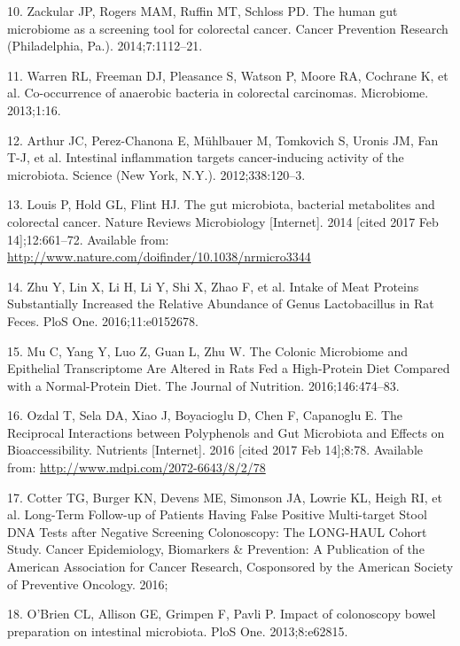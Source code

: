 \documentclass[12pt,]{article}
\begin{document}
\hypertarget{ref-zackular_human_2014}{}
10. Zackular JP, Rogers MAM, Ruffin MT, Schloss PD. The human gut
microbiome as a screening tool for colorectal cancer. Cancer Prevention
Research (Philadelphia, Pa.). 2014;7:1112--21.

\hypertarget{ref-warren_co-occurrence_2013}{}
11. Warren RL, Freeman DJ, Pleasance S, Watson P, Moore RA, Cochrane K,
et al. Co-occurrence of anaerobic bacteria in colorectal carcinomas.
Microbiome. 2013;1:16.

\hypertarget{ref-arthur_intestinal_2012}{}
12. Arthur JC, Perez-Chanona E, Mühlbauer M, Tomkovich S, Uronis JM, Fan
T-J, et al. Intestinal inflammation targets cancer-inducing activity of
the microbiota. Science (New York, N.Y.). 2012;338:120--3.

\hypertarget{ref-louis_gut_2014}{}
13. Louis P, Hold GL, Flint HJ. The gut microbiota, bacterial
metabolites and colorectal cancer. Nature Reviews Microbiology
{[}Internet{]}. 2014 {[}cited 2017 Feb 14{]};12:661--72. Available from:
\url{http://www.nature.com/doifinder/10.1038/nrmicro3344}

\hypertarget{ref-zhu_intake_2016}{}
14. Zhu Y, Lin X, Li H, Li Y, Shi X, Zhao F, et al. Intake of Meat
Proteins Substantially Increased the Relative Abundance of Genus
Lactobacillus in Rat Feces. PloS One. 2016;11:e0152678.

\hypertarget{ref-mu_colonic_2016}{}
15. Mu C, Yang Y, Luo Z, Guan L, Zhu W. The Colonic Microbiome and
Epithelial Transcriptome Are Altered in Rats Fed a High-Protein Diet
Compared with a Normal-Protein Diet. The Journal of Nutrition.
2016;146:474--83.

\hypertarget{ref-ozdal_reciprocal_2016}{}
16. Ozdal T, Sela DA, Xiao J, Boyacioglu D, Chen F, Capanoglu E. The
Reciprocal Interactions between Polyphenols and Gut Microbiota and
Effects on Bioaccessibility. Nutrients {[}Internet{]}. 2016 {[}cited
2017 Feb 14{]};8:78. Available from:
\url{http://www.mdpi.com/2072-6643/8/2/78}

\hypertarget{ref-cotter_long-term_2016}{}
17. Cotter TG, Burger KN, Devens ME, Simonson JA, Lowrie KL, Heigh RI,
et al. Long-Term Follow-up of Patients Having False Positive
Multi-target Stool DNA Tests after Negative Screening Colonoscopy: The
LONG-HAUL Cohort Study. Cancer Epidemiology, Biomarkers \& Prevention: A
Publication of the American Association for Cancer Research, Cosponsored
by the American Society of Preventive Oncology. 2016;

\hypertarget{ref-obrien_impact_2013}{}
18. O'Brien CL, Allison GE, Grimpen F, Pavli P. Impact of colonoscopy
bowel preparation on intestinal microbiota. PloS One. 2013;8:e62815.
\end{document}
